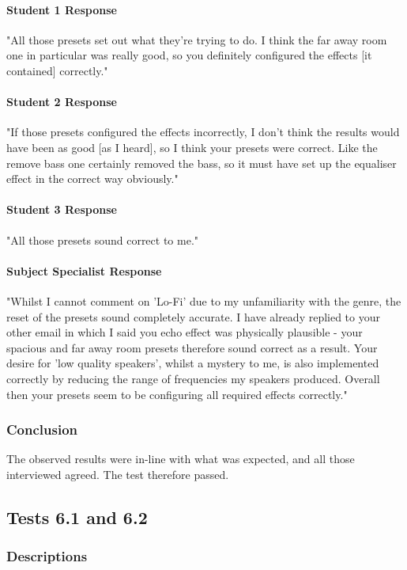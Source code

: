 \paragraph{Student 1 Response}
"All those presets set out what they're trying to do. I think the far away room one in particular was really good, so you definitely configured the effects [it contained] correctly."

\paragraph{Student 2 Response}
"If those presets configured the effects incorrectly, I don't think the results would have been as good [as I heard], so I think your presets were correct. Like the remove bass one certainly removed the bass, so it must have set up the equaliser effect in the correct way obviously."

\paragraph{Student 3 Response}
"All those presets sound correct to me."

\paragraph{Subject Specialist Response}
"Whilst I cannot comment on 'Lo-Fi' due to my unfamiliarity with the genre, the reset of the presets sound completely accurate. I have already replied to your other email in which I said you echo effect was physically plausible - your spacious and far away room presets therefore sound correct as a result. Your desire for 'low quality speakers', whilst a mystery to me, is also implemented correctly by reducing the range of frequencies my speakers produced. Overall then your presets seem to be configuring all required effects correctly."

\subsubsection*{Conclusion}
The observed results were in-line with what was expected, and all those interviewed agreed. The test therefore passed.

\pagebreak
\subsection{Tests 6.1 and 6.2}
\subsubsection*{Descriptions}
